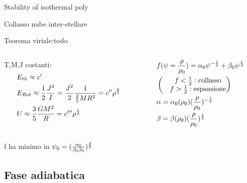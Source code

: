 \begin{frame}{Stability of isothermal poly}
\begin{wordonframe}{Collasso nube inter-stellare}\tolbf
\begin{block}{Teorema viriale:todo}\end{block}
\begin{columns}[T]
\begin{column}{0.5\textwidth}
T,M,J costanti:
\begin{align*}
&E_{th}\approx c'\\
&E_{Rot}\approx\frac{1}{2}\frac{J^2}{I}=\frac{J^2}{2}\frac{1}{\frac{2}{5}MR^2}=c''\rho^{\frac{2}{3}}\\
&U\approx\frac{3}{5}\frac{GM^2}{R}=c'''\rho^{\frac{1}{3}}
\end{align*}
\end{column}
\begin{column}{0.5\textwidth}
\begin{align*}
&f(\psi=\frac{\rho}{\rho_0})=\alpha_0\psi^{-\frac{1}{3}}+\beta_0\psi^{\frac{1}{3}}\\
&\begin{pmatrix}
&f<\frac{1}{2}: \text{collasso}\\
&f>\frac{1}{2}: \text{espansione}\\
\end{pmatrix}\\
&\alpha=\alpha_0(\rho_0)(\frac{\rho}{\rho_0})^{-\frac{1}{3}}\\
&\beta=\beta(\rho_0)(\frac{\rho}{\rho_0})^{\frac{1}{3}}
\end{align*}
\end{column}
\end{columns}
f ha minimo in $\psi_0=(\frac{\alpha_0}{\beta_0\beta_0})^{\frac{3}{2}}$
\end{wordonframe}

\subsection{Fase adiabatica}


\end{frame}
